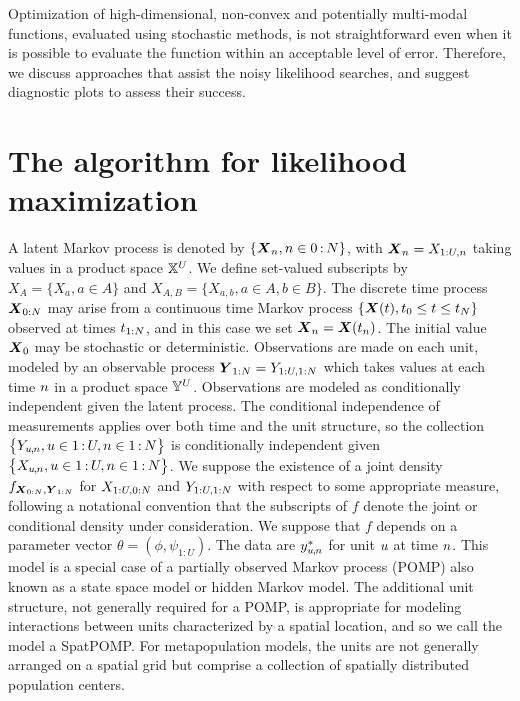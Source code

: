 \documentclass[12pt]{article}\usepackage[]{graphicx}\usepackage[]{xcolor}
\begin{document}
Optimization of high-dimensional, non-convex and potentially multi-modal functions, evaluated using stochastic methods, is not straightforward even when it is possible to evaluate the function within an acceptable level of error.
Therefore, we discuss approaches that assist the noisy likelihood searches, and suggest diagnostic plots to assess their success.

\section{The {\ibpf} algorithm for likelihood maximization}
\label{sec:alg}

A latent Markov process is denoted by $\{\boldsymbol{X}_{n},n\in {0}{\hspace{0.6mm}:\hspace{0.6mm}}{N}\}$, with $\boldsymbol{X}_{n}=X_{1:U,n}$ taking values in a product space ${\mathbb X}^U$.
We define set-valued subscripts by $X_A=\{X_a,a\in A\}$ and $X_{A,B}=\{X_{a,b}, a\in A, b\in B\}$.
The discrete time process $\boldsymbol{X}_{0:N}$ may arise from a continuous time Markov process $\{\boldsymbol{X}(t), t_0\le t\le t_{N} \}$ observed at times $t_{1:N}$, and in this case we set $\boldsymbol{X}_n=\boldsymbol{X}(t_n)$.
The initial value $\boldsymbol{X}_{0}$ may be stochastic or deterministic.
Observations are made on each unit, modeled by an observable process $\boldsymbol{Y}_{1:N}=Y_{1:U,1:N}$ which takes values  at each time $n$ in a product space ${\mathbb Y}^U$.
Observations are modeled as conditionally independent given the latent process.
The conditional independence of measurements applies over both time and the unit structure, so the collection $\big\{Y_{u{\hspace{-0.25mm},\hspace{-0.2mm}}n},u\in{1}{\hspace{0.6mm}:\hspace{0.6mm}}{U},n\in{1}{\hspace{0.6mm}:\hspace{0.6mm}}{N}\big\}$ is conditionally independent given
$\big\{X_{u{\hspace{-0.25mm},\hspace{-0.2mm}}n},u\in{1}{\hspace{0.6mm}:\hspace{0.6mm}}{U},n\in{1}{\hspace{0.6mm}:\hspace{0.6mm}}{N}\big\}$.
We suppose the existence of a joint density $f_{\boldsymbol{X}_{0:N},\boldsymbol{Y}_{1:N}}$  for $X_{1:U,0:N}$ and $Y_{1:U,1:N}$ with respect to some appropriate measure, following a notational convention that the subscripts of $f$ denote the joint or conditional density under consideration.
We suppose that $f$ depends on a parameter vector $\theta=(\phi,\psi_{1:U})$.
The data are $y^*_{u{\hspace{-0.25mm},\hspace{-0.2mm}}n}$ for unit $u$ at time $n$.
This model is a special case of a  partially observed Markov process (POMP) also known as a state space model or hidden Markov model.
The additional unit structure, not generally required for a POMP, is appropriate for modeling interactions between units characterized by a spatial location, and so we call the model a SpatPOMP.
For metapopulation models, the units are not generally arranged on a spatial grid but comprise a collection of spatially distributed population centers.
\end{document}
